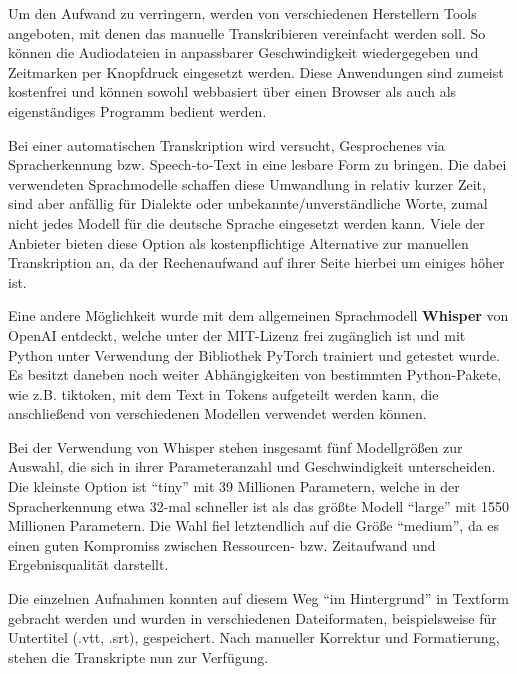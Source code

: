 Um den Aufwand zu verringern, werden von verschiedenen Herstellern Tools angeboten, mit denen das manuelle Transkribieren vereinfacht werden soll. So können die Audiodateien in anpassbarer Geschwindigkeit wiedergegeben und Zeitmarken per Knopfdruck eingesetzt werden. Diese Anwendungen sind zumeist kostenfrei und können sowohl webbasiert über einen Browser als auch als eigenständiges Programm bedient werden.

Bei einer automatischen Transkription wird versucht, Gesprochenes via Spracherkennung bzw. Speech-to-Text in eine lesbare Form zu bringen. Die dabei verwendeten Sprachmodelle schaffen diese Umwandlung in relativ kurzer Zeit, sind aber anfällig für Dialekte oder unbekannte/unverständliche Worte, zumal nicht jedes Modell für die deutsche Sprache eingesetzt werden kann. Viele der Anbieter bieten diese Option als kostenpflichtige Alternative zur manuellen Transkription an, da der Rechenaufwand auf ihrer Seite hierbei um einiges höher ist.

Eine andere Möglichkeit wurde mit dem allgemeinen Sprachmodell \textbf{Whisper} von OpenAI entdeckt, welche unter der MIT-Lizenz frei zugänglich ist und mit Python unter Verwendung der Bibliothek PyTorch trainiert und getestet wurde. Es besitzt daneben noch weiter Abhängigkeiten von bestimmten Python-Pakete, wie z.B. tiktoken, mit dem Text in Tokens aufgeteilt werden kann, die anschließend von verschiedenen Modellen verwendet werden können.

Bei der Verwendung von Whisper stehen insgesamt fünf Modellgrößen zur Auswahl, die sich in ihrer Parameteranzahl und Geschwindigkeit unterscheiden. Die kleinste Option ist \enquote{tiny} mit 39 Millionen Parametern, welche in der Spracherkennung etwa 32-mal schneller ist als das größte Modell \enquote{large} mit 1550 Millionen Parametern. Die Wahl fiel letztendlich auf die Größe \enquote{medium}, da es einen guten Kompromiss zwischen Ressourcen- bzw. Zeitaufwand und Ergebnisqualität darstellt.

Die einzelnen Aufnahmen konnten auf diesem Weg \enquote{im Hintergrund} in Textform gebracht werden und wurden in verschiedenen Dateiformaten, beispielsweise für Untertitel (.vtt, .srt), gespeichert. Nach manueller Korrektur und Formatierung, stehen die Transkripte nun zur Verfügung.
